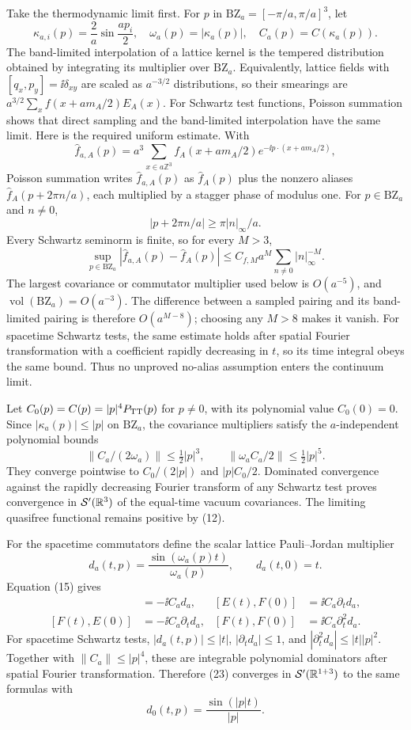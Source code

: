 Take the thermodynamic limit first.  For $p$ in
$\mathrm{BZ}_a=[-\pi/a,\pi/a]^3$, let
\[
 \kappa_{a,i}(p)=\frac2a\sin\frac{ap_i}{2},\quad
 \omega_a(p)=|\kappa_a(p)|,\quad C_a(p)=C(\kappa_a(p)).          \tag{20}
\]
The band-limited interpolation of a lattice kernel is the tempered
distribution obtained by integrating its multiplier over $\mathrm{BZ}_a$.
Equivalently, lattice fields with $[q_x,p_y]=\ii\delta_{xy}$ are scaled as
$a^{-3/2}$ distributions, so their smearings are
$a^{3/2}\sum_x f(x+a m_A/2)E_A(x)$.  For Schwartz test functions, Poisson
summation shows that direct sampling and the band-limited interpolation have
the same limit.  Here is the required uniform estimate.  With
\[
 \widehat f_{a,A}(p)
 =a^3\sum_{x\in a\mathbb Z^3}
 f_A(x+a m_A/2)e^{-\ii p\cdot(x+a m_A/2)},
\]
Poisson summation writes $\widehat f_{a,A}(p)$ as
$\widehat f_A(p)$ plus the nonzero aliases
$\widehat f_A(p+2\pi n/a)$, each multiplied by a stagger phase of modulus
one.  For $p\in\mathrm{BZ}_a$ and $n\ne0$,
\[
 |p+2\pi n/a|\ge \pi |n|_\infty/a.
\]
Every Schwartz seminorm is finite, so for every $M>3$,
\[
 \sup_{p\in\mathrm{BZ}_a}
 |\widehat f_{a,A}(p)-\widehat f_A(p)|
 \le C_{f,M}a^M
 \sum_{n\ne0}|n|_\infty^{-M}.                     \tag{20a}
\]
The largest covariance or commutator multiplier used below is
$O(a^{-5})$, and $\operatorname{vol}(\mathrm{BZ}_a)=O(a^{-3})$.
The difference between a sampled pairing and its band-limited pairing is
therefore $O(a^{M-8})$; choosing any $M>8$ makes it vanish.  For spacetime
Schwartz tests, the same estimate holds after spatial Fourier transformation
with a coefficient rapidly decreasing in $t$, so its time integral obeys the
same bound.  Thus no unproved no-alias assumption enters the continuum limit.

Let $C_0(p)=C(p)=|p|^4P_{\mathrm{TT}}(p)$ for $p\ne0$, with its polynomial value
$C_0(0)=0$.  Since $|\kappa_a(p)|\le |p|$ on $\mathrm{BZ}_a$, the covariance
multipliers satisfy the $a$-independent polynomial bounds
\[
 \|C_a/(2\omega_a)\|\le\tfrac12|p|^3,\qquad
 \|\omega_a C_a/2\|\le\tfrac12|p|^5.              \tag{21}
\]
They converge pointwise to $C_0/(2|p|)$ and $|p|C_0/2$.  Dominated
convergence against the rapidly decreasing Fourier transform of any Schwartz
test proves convergence in $\mathcal S'(\mathbb R^3)$ of the equal-time vacuum
covariances.  The limiting quasifree functional remains positive by (12).

For the spacetime commutators define the scalar lattice Pauli--Jordan
multiplier
\[
 d_a(t,p)=\frac{\sin(\omega_a(p)t)}{\omega_a(p)},\qquad d_a(t,0)=t.           \tag{22}
\]
Equation (15) gives
\begin{align}
 [E(t),E(0)]&=-\ii C_a d_a,&
 [E(t),F(0)]&= \ii C_a\partial_t d_a,\nonumber\\
 [F(t),E(0)]&=-\ii C_a\partial_t d_a,&
 [F(t),F(0)]&= \ii C_a\partial_t^2 d_a.             \tag{23}
\end{align}
For spacetime Schwartz tests, $|d_a(t,p)|\le |t|$,
$|\partial_td_a|\le1$, and
$|\partial_t^2d_a|\le |t||p|^2$.  Together with
$\|C_a\|\le|p|^4$, these are integrable polynomial dominators after spatial
Fourier transformation.  Therefore (23) converges in
$\mathcal S'(\mathbb R^{1+3})$ to the same formulas with
\[
 d_0(t,p)=\frac{\sin(|p|t)}{|p|}.                  \tag{24}
\]

